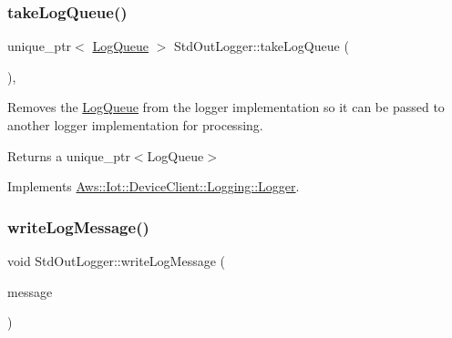 \mbox{\label{class_aws_1_1_iot_1_1_device_client_1_1_logging_1_1_std_out_logger_acff57144a637686b21f27aa0da9628a2}} 
\subsubsection{\texorpdfstring{take\+Log\+Queue()}{takeLogQueue()}}
{\footnotesize\ttfamily unique\+\_\+ptr$<$ \hyperlink{class_aws_1_1_iot_1_1_device_client_1_1_logging_1_1_log_queue}{Log\+Queue} $>$ Std\+Out\+Logger\+::take\+Log\+Queue (\begin{DoxyParamCaption}{ }\end{DoxyParamCaption})\hspace{0.3cm}{\ttfamily [override]}, {\ttfamily [virtual]}}



Removes the \hyperlink{class_aws_1_1_iot_1_1_device_client_1_1_logging_1_1_log_queue}{Log\+Queue} from the logger implementation so it can be passed to another logger implementation for processing. 

\begin{DoxyReturn}{Returns}
a unique\+\_\+ptr$<$\+Log\+Queue$>$ 
\end{DoxyReturn}


Implements \hyperlink{class_aws_1_1_iot_1_1_device_client_1_1_logging_1_1_logger_a39f3326be17f9ed4b1385f057134774d}{Aws\+::\+Iot\+::\+Device\+Client\+::\+Logging\+::\+Logger}.

\mbox{\label{class_aws_1_1_iot_1_1_device_client_1_1_logging_1_1_std_out_logger_a795accad8a751b0f94341bb1b3325121}} 
\subsubsection{\texorpdfstring{write\+Log\+Message()}{writeLogMessage()}}
{\footnotesize\ttfamily void Std\+Out\+Logger\+::write\+Log\+Message (\begin{DoxyParamCaption}\item[{std\+::unique\+\_\+ptr$<$ \hyperlink{class_aws_1_1_iot_1_1_device_client_1_1_logging_1_1_log_message}{Log\+Message} $>$}]{message }\end{DoxyParamCaption})\hspace{0.3cm}{\ttfamily [private]}}



